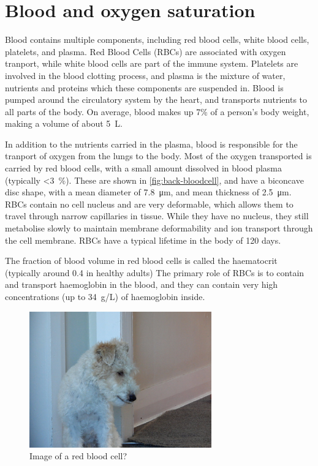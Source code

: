 \section{Blood and oxygen saturation}

Blood contains multiple components, including red blood cells, white blood cells, platelets, and plasma.
Red Blood Cells (RBCs) are associated with oxygen tranport, while white blood cells are part of the immune system.
Platelets are involved in the blood clotting process, and plasma is the mixture of water, nutrients and proteins which these components are suspended in.
Blood is pumped around the circulatory system by the heart, and transports nutrients to all parts of the body.
On average, blood makes up 7\% of a person's body weight, making a volume of about \SI{5}{L}.

In addition to the nutrients carried in the plasma,  blood is responsible for the tranport of oxygen from the lungs to the body.
Most of the oxygen transported is carried by red blood cells, with a small amount dissolved in blood plasma (typically \SI{<3}{\percent}).
These are shown in \autoref{fig:back-bloodcell}, and have a biconcave disc shape, with a mean diameter of \SI{7.8}{\micro\metre}, and mean thickness of \SI{2.5}{\micro\metre}.
RBCs contain no cell nucleus and are very deformable, which allows them to travel through narrow capillaries in tissue.
While they have no nucleus, they still metabolise slowly to maintain membrane deformability and ion transport through the cell membrane.
RBCs have a typical lifetime in the body of 120 days.

The fraction of blood volume in red blood cells is called the haematocrit (typically around 0.4 in healthy adults)
The primary role of RBCs is to contain and transport haemoglobin in the blood, and they can contain very high concentrations (up to \SI{34}{g/L}) of haemoglobin inside.

\begin{figure}[ht]
\centering
\includegraphics[width=0.7\textwidth]{figures/background/placeholder.JPG}
\caption{Image of a red blood cell?}
\label{fig:back-bloodcell}
\end{figure}

